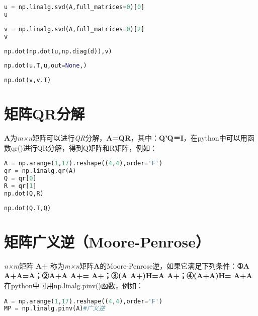 \documentclass[UTF8,a4paper,12pt]{ctexart}  %
\begin{document}
\begin{lstlisting}[language=Python]
u = np.linalg.svd(A,full_matrices=0)[0]
u
\end{lstlisting}

\begin{lstlisting}[language=Python]
v = np.linalg.svd(A,full_matrices=0)[2]
v
\end{lstlisting}

\begin{lstlisting}[language=Python]
np.dot(np.dot(u,np.diag(d)),v)
\end{lstlisting}

\begin{lstlisting}[language=Python]
np.dot(u.T,u,out=None,)
\end{lstlisting}

\begin{lstlisting}[language=Python]
np.dot(v,v.T)
\end{lstlisting}

\hypertarget{qr}{%
\section{矩阵QR分解}\label{qr}}

\textbf{A}为\emph{m×n}矩阵可以进行\emph{QR}分解，\textbf{A=QR}，其中：\textbf{Q'Q＝I}，在python中可以用函数qr()进行QR分解，得到Q矩阵和R矩阵，例如：

\begin{lstlisting}[language=Python]
A = np.arange(1,17).reshape((4,4),order='F')
qr = np.linalg.qr(A)
Q = qr[0]
R = qr[1]
np.dot(Q,R)
\end{lstlisting}

\begin{lstlisting}[language=Python]
np.dot(Q.T,Q)
\end{lstlisting}

\hypertarget{moore-penrose}{%
\section{矩阵广义逆（Moore-Penrose）}\label{moore-penrose}}

\emph{n×m}矩阵 \textbf{A+} 称为\emph{m×n}矩阵\textbf{A}的Moore-Penrose逆，如果它满足下列条件：\textbf{①A A+A=A；②A+A A+= A+；③(A A+)H=A A+；④(A+A)H= A+A}
在python中可用np.linalg.pinv()函数，例如：

\begin{lstlisting}[language=Python]
A = np.arange(1,17).reshape((4,4),order='F')
MP = np.linalg.pinv(A)#广义逆
\end{lstlisting}
\end{document}
